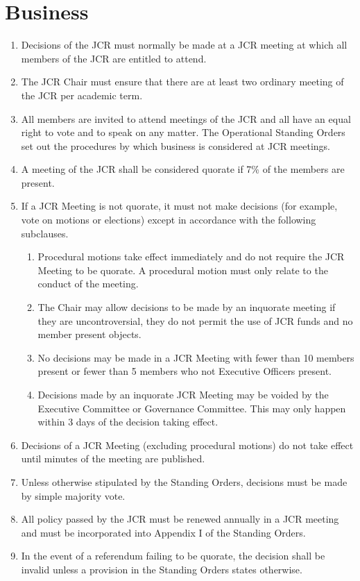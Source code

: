 \documentclass[12pt]{article}
\begin{document}
\section{Business}
\begin{enumerate}
    \item Decisions of the JCR must normally be made at a JCR meeting at which all members of the JCR are entitled to attend.
    \item The JCR Chair must ensure that there are at least two ordinary meeting of the JCR per academic term.
    \item All members are invited to attend meetings of the JCR and all have an equal right to vote and to speak on any matter. The Operational Standing Orders set out the procedures by which business is considered at JCR meetings.
    \item A meeting of the JCR shall be considered quorate if 7\% of the members are present.
    \item If a JCR Meeting is not quorate, it must not make decisions (for example, vote on motions or elections) except in accordance with the following subclauses.
    \begin{enumerate}
        \item Procedural motions take effect immediately and do not require the JCR Meeting to be quorate. A procedural motion must only relate to the conduct of the meeting.
        \item The Chair may allow decisions to be made by an inquorate meeting if they are uncontroversial, they do not permit the use of JCR funds and no member present objects.
        \item No decisions may be made in a JCR Meeting with fewer than 10 members present or fewer than 5 members who not Executive Officers present.
        \item Decisions made by an inquorate JCR Meeting may be voided by the Executive Committee or Governance Committee. This may only happen within 3 days of the decision taking effect.
    \end{enumerate}
    \item Decisions of a JCR Meeting (excluding procedural motions) do not take effect until minutes of the meeting are published.
    \item Unless otherwise stipulated by the Standing Orders, decisions must be made by simple majority vote.
    \item All policy passed by the JCR must be renewed annually in a JCR meeting and must be incorporated into Appendix I of the Standing Orders.
    \item In the event of a referendum failing to be quorate, the decision shall be invalid unless a provision in the Standing Orders states otherwise.

\end{enumerate}
\end{document}
